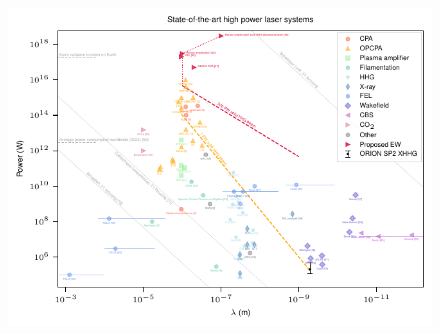 \begin{figure}
	\centering
	\includegraphics[width=\linewidth]{figures/intro/laser_systems}

\end{figure}
